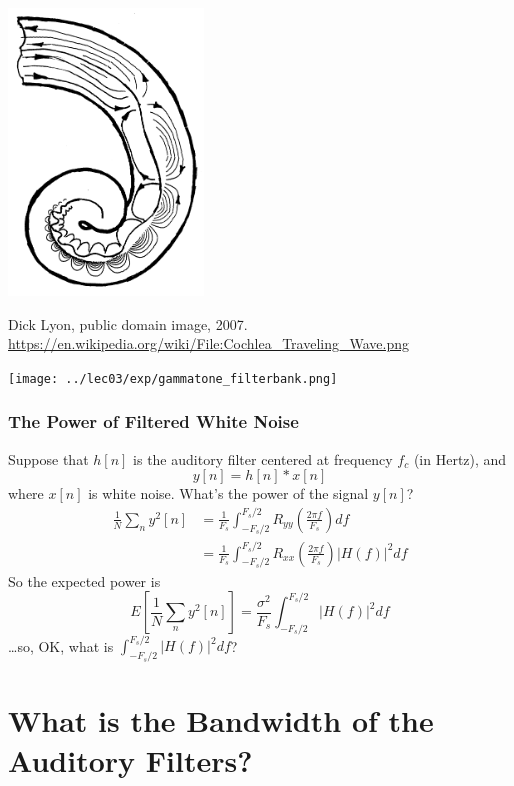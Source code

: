 \documentclass{beamer}
\begin{document}
\begin{frame}
  \centerline{\includegraphics[height=3in]{../lec03/Cochlea_Traveling_Wave.png}}
  \begin{tiny}
    Dick Lyon, public domain image, 2007.
    \url{https://en.wikipedia.org/wiki/File:Cochlea_Traveling_Wave.png}
  \end{tiny}
\end{frame}

\begin{frame}
  \centerline{\texttt{[image: ../lec03/exp/gammatone\_filterbank.png]}}
\end{frame}
     
\begin{frame}
  \frametitle{The Power of Filtered White Noise}

  Suppose that $h[n]$ is the auditory filter centered at frequency $f_c$ (in Hertz), and
  \[
  y[n]=h[n]\ast x[n]
  \]
  where $x[n]$ is white noise.  What's the power of the signal $y[n]$?
  \begin{align*}
    \frac{1}{N}\sum_n y^2[n] &= \frac{1}{F_s}\int_{-F_s/2}^{F_s/2} R_{yy}\left(\frac{2\pi f}{F_s}\right) df\\
    &= \frac{1}{F_s}\int_{-F_s/2}^{F_s/2} R_{xx}\left(\frac{2\pi f}{F_s}\right)|H(f)|^2 df
  \end{align*}
  So the expected power is
  \[
  E\left[\frac{1}{N}\sum_n y^2[n]\right] = \frac{\sigma^2}{F_s}\int_{-F_s/2}^{F_s/2} |H(f)|^2 df
  \]
  \ldots so, OK, what is $\int_{-F_s/2}^{F_s/2} |H(f)|^2 df$?
\end{frame}

\section[Bandwidth]{What is the Bandwidth of the Auditory Filters?}
\setcounter{subsection}{1}
\end{document}

